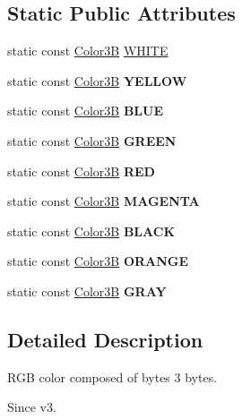 \subsection*{Static Public Attributes}
\begin{DoxyCompactItemize}
\item 
static const \hyperlink{structColor3B}{Color3B} \hyperlink{structColor3B_adf57cb86ca15f434b29215ad471cdc35}{W\+H\+I\+TE}
\item 
\mbox{\label{structColor3B_a1db5ef1d85f46e8d9ab39f8227f1b340}} 
static const \hyperlink{structColor3B}{Color3B} {\bfseries Y\+E\+L\+L\+OW}
\item 
\mbox{\label{structColor3B_a64cbd836586e12291a5595f9da824435}} 
static const \hyperlink{structColor3B}{Color3B} {\bfseries B\+L\+UE}
\item 
\mbox{\label{structColor3B_aa273a857384974ff75d0adce26c48c03}} 
static const \hyperlink{structColor3B}{Color3B} {\bfseries G\+R\+E\+EN}
\item 
\mbox{\label{structColor3B_a12ebfdd6634e192cc507e4bed82af163}} 
static const \hyperlink{structColor3B}{Color3B} {\bfseries R\+ED}
\item 
\mbox{\label{structColor3B_a17c4aaf17cc7c38f2bcd0295fcbdae37}} 
static const \hyperlink{structColor3B}{Color3B} {\bfseries M\+A\+G\+E\+N\+TA}
\item 
\mbox{\label{structColor3B_a666c95051c0102b9434f3026adec8a2e}} 
static const \hyperlink{structColor3B}{Color3B} {\bfseries B\+L\+A\+CK}
\item 
\mbox{\label{structColor3B_a6ac59bd96464531ced253355d7fa9f7a}} 
static const \hyperlink{structColor3B}{Color3B} {\bfseries O\+R\+A\+N\+GE}
\item 
\mbox{\label{structColor3B_a80ee04f81cecd6dec0804bdda14dc4d5}} 
static const \hyperlink{structColor3B}{Color3B} {\bfseries G\+R\+AY}
\end{DoxyCompactItemize}


\subsection{Detailed Description}
R\+GB color composed of bytes 3 bytes. \begin{DoxySince}{Since}
v3. 
\end{DoxySince}


